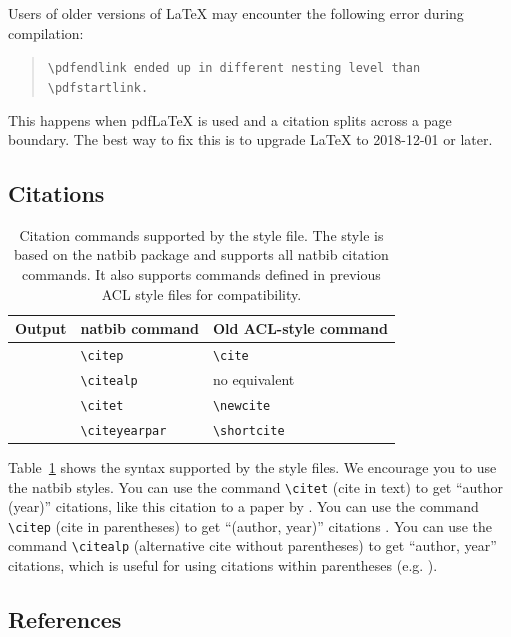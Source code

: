 \documentclass[11pt]{article}
\begin{document}
Users of older versions of \LaTeX{} may encounter the following error during compilation:
\begin{quote}
\tt\verb|\pdfendlink| ended up in different nesting level than \verb|\pdfstartlink|.
\end{quote}
This happens when pdf\LaTeX{} is used and a citation splits across a page boundary. The best way to fix this is to upgrade \LaTeX{} to 2018-12-01 or later.

\subsection{Citations}

\begin{table}
\centering
\begin{tabular}{lll}
\hline
\textbf{Output} & \textbf{natbib command} & \textbf{Old ACL-style command}\\
\hline
\citep{Gusfield:97} & \verb|\citep| & \verb|\cite| \\
\citealp{Gusfield:97} & \verb|\citealp| & no equivalent \\
\citet{Gusfield:97} & \verb|\citet| & \verb|\newcite| \\
\citeyearpar{Gusfield:97} & \verb|\citeyearpar| & \verb|\shortcite| \\
\hline
\end{tabular}
\caption{\label{citation-guide}
Citation commands supported by the style file.
The style is based on the natbib package and supports all natbib citation commands.
It also supports commands defined in previous ACL style files for compatibility.
}
\end{table}

Table~\ref{citation-guide} shows the syntax supported by the style files.
We encourage you to use the natbib styles.
You can use the command \verb|\citet| (cite in text) to get ``author (year)'' citations, like this citation to a paper by \citet{Gusfield:97}.
You can use the command \verb|\citep| (cite in parentheses) to get ``(author, year)'' citations \citep{Gusfield:97}.
You can use the command \verb|\citealp| (alternative cite without parentheses) to get ``author, year'' citations, which is useful for using citations within parentheses (e.g. \citealp{Gusfield:97}).

\subsection{References}
\end{document}
